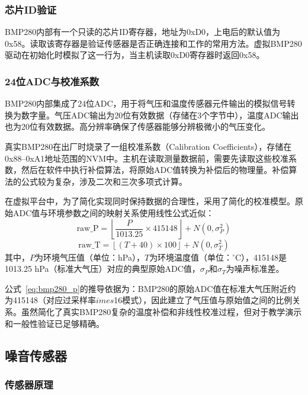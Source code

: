 \documentclass[12pt,a4paper]{ctexart}
\begin{document}
\subsubsection{芯片ID验证}

BMP280内部有一个只读的芯片ID寄存器，地址为0xD0，上电后的默认值为0x58。读取该寄存器是验证传感器是否正确连接和工作的常用方法。虚拟BMP280驱动在初始化时模拟了这一行为，当主机读取0xD0寄存器时返回0x58。

\subsubsection{24位ADC与校准系数}

BMP280内部集成了24位ADC，用于将气压和温度传感器元件输出的模拟信号转换为数字量。气压ADC输出为20位有效数据（存储在3个字节中），温度ADC输出也为20位有效数据。高分辨率确保了传感器能够分辨极微小的气压变化。

真实BMP280在出厂时烧录了一组校准系数（Calibration Coefficients），存储在0x88--0xA1地址范围的NVM中。主机在读取测量数据前，需要先读取这些校准系数，然后在软件中执行补偿算法，将原始ADC值转换为补偿后的物理量。补偿算法的公式较为复杂，涉及二次和三次多项式计算。

在虚拟平台中，为了简化实现同时保持数据的合理性，采用了简化的校准模型。原始ADC值与环境参数之间的映射关系使用线性公式近似：
\begin{equation}
    \text{raw\_P} = \left\lfloor \frac{P}{1013.25} \times 415148 \right\rfloor + N(0, \sigma_P^2)
    \label{eq:bmp280_p}
\end{equation}
\begin{equation}
    \text{raw\_T} = \left\lfloor (T + 40) \times 100 \right\rfloor + N(0, \sigma_T^2)
\end{equation}
其中，$P$为环境气压值（单位：hPa），$T$为环境温度值（单位：$^\circ$C），415148是1013.25 hPa（标准大气压）对应的典型原始ADC值，$\sigma_P$和$\sigma_T$为噪声标准差。

公式~\ref{eq:bmp280_p}的推导依据为：BMP280的原始ADC值在标准大气压附近约为415148（对应过采样率$	imes$16模式），因此建立了气压值与原始值之间的比例关系。虽然简化了真实BMP280复杂的温度补偿和非线性校准过程，但对于教学演示和一般性验证已足够精确。

\subsection{噪音传感器}

\subsubsection{传感器原理}
\end{document}
